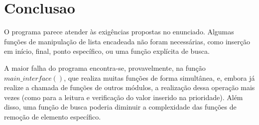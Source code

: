 \documentclass{article}
\begin{document}
\section{Conclusao}
O programa parece atender às exigências propostas no enunciado. Algumas funções de manipulação de lista encadeada não foram necessárias, como inserção em início, final, ponto específico, ou uma função explícita de busca.

A maior falha do programa encontra-se, provavelmente, na função $main\_interface()$, que realiza muitas funções de forma simultânea, e, embora já realize a chamada de funções de outros módulos, a realização dessa operação mais vezes (como para a leitura e verificação do valor inserido na prioridade). Além disso, uma função de busca poderia diminuir a complexidade das funções de remoção de elemento específico.
\end{document}
